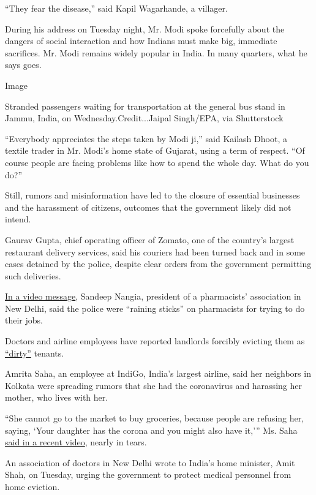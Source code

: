 ``They fear the disease,'' said Kapil Wagarhande, a villager.

During his address on Tuesday night, Mr. Modi spoke forcefully about the
dangers of social interaction and how Indians must make big, immediate
sacrifices. Mr. Modi remains widely popular in India. In many quarters,
what he says goes.

Image

Stranded passengers waiting for transportation at the general bus stand
in Jammu, India, on Wednesday.Credit...Jaipal Singh/EPA, via
Shutterstock

``Everybody appreciates the steps taken by Modi ji,'' said Kailash
Dhoot, a textile trader in Mr. Modi's home state of Gujarat, using a
term of respect. ``Of course people are facing problems like how to
spend the whole day. What do you do?''

Still, rumors and misinformation have led to the closure of essential
businesses and the harassment of citizens, outcomes that the government
likely did not intend.

Gaurav Gupta, chief operating officer of Zomato, one of the country's
largest restaurant delivery services, said his couriers had been turned
back and in some cases detained by the police, despite clear orders from
the government permitting such deliveries.

\href{https://twitter.com/Teensthack/status/1242697679450210307}{In a
video message}, Sandeep Nangia, president of a pharmacists' association
in New Delhi, said the police were ``raining sticks'' on pharmacists for
trying to do their jobs.

Doctors and airline employees have reported landlords forcibly evicting
them as
\href{https://qz.com/india/1824866/indian-doctors-fighting-coronavirus-now-face-social-stigma/}{``dirty''}
tenants.

Amrita Saha, an employee at IndiGo, India's largest airline, said her
neighbors in Kolkata were spreading rumors that she had the coronavirus
and harassing her mother, who lives with her.

``She cannot go to the market to buy groceries, because people are
refusing her, saying, `Your daughter has the corona and you might also
have it,''' Ms. Saha
\href{https://twitter.com/Zebaism/status/1242309348749172736}{said in a
recent video}, nearly in tears.

An association of doctors in New Delhi wrote to India's home minister,
Amit Shah, on Tuesday, urging the government to protect medical
personnel from home eviction.

